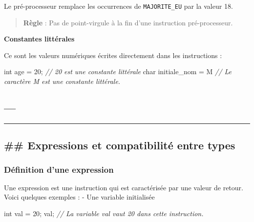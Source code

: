 \documentclass[11pt]{article}
\newenvironment{Shaded}{}{}
\newcommand{\DataTypeTok}[1]{\textcolor[rgb]{0.56,0.13,0.00}{{#1}}}
\newcommand{\DecValTok}[1]{\textcolor[rgb]{0.25,0.63,0.44}{{#1}}}
\newcommand{\CharTok}[1]{\textcolor[rgb]{0.25,0.44,0.63}{{#1}}}
\newcommand{\CommentTok}[1]{\textcolor[rgb]{0.38,0.63,0.69}{\textit{{#1}}}}
\newcommand{\NormalTok}[1]{{#1}}
\begin{document}
Le pré-processeur remplace les occurrences de \texttt{MAJORITE\_EU} par
la valeur 18.

\begin{quote}
\textbf{Règle} : Pas de point-virgule à la fin d'une instruction
pré-processeur.
\end{quote}

\textbf{Constantes littérales}

Ce sont les valeurs numériques écrites directement dans les instructions
:

\begin{Shaded}
\begin{Highlighting}[]
    \DataTypeTok{int}\NormalTok{ age = }\DecValTok{20}\NormalTok{; }\CommentTok{// 20 est une constante littérale}
    \DataTypeTok{char}\NormalTok{ initiale\_nom = }\CharTok{\textquotesingle{}M\textquotesingle{}} \CommentTok{// Le caractère \textquotesingle{}M\textquotesingle{} est une constante littérale.}
\end{Highlighting}
\end{Shaded}

    \hypertarget{section}{%
\subsection{---}\label{section}}

\begin{center}\rule{0.5\linewidth}{0.5pt}\end{center}

    \hypertarget{expressions-et-compatibilituxe9-entre-types}{%
\subsection{\#\# Expressions et compatibilité entre
types}\label{expressions-et-compatibilituxe9-entre-types}}

    \hypertarget{duxe9finition-dune-expression}{%
\subsubsection{Définition d'une
expression}\label{duxe9finition-dune-expression}}

Une expression est une instruction qui est caractérisée par une valeur
de retour. Voici quelques exemples : - Une variable initialisée

\begin{Shaded}
\begin{Highlighting}[]
     \DataTypeTok{int}\NormalTok{ val = }\DecValTok{20}\NormalTok{;}
\NormalTok{     val; }\CommentTok{// La variable \textasciigrave{}val\textasciigrave{} vaut 20 dans cette instruction.}
\end{Highlighting}
\end{Shaded}
\end{document}
